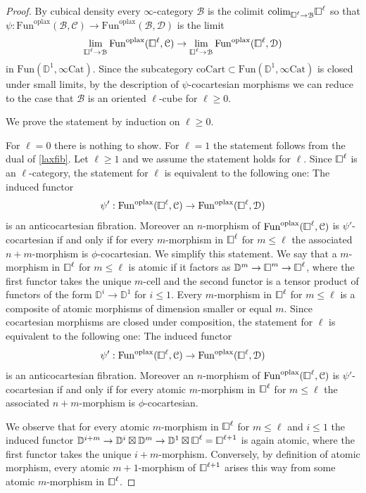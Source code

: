 \documentclass[10pt,oneside]{article}
\numberwithin{equation}{section} %
\numberwithin{figure}{section} %
\theoremstyle{plain}
\theoremstyle{definition}
\newcommand{\bD}{{\mathbb D}}
\newcommand{\mB}{{\mathcal B}}
\newcommand{\mC}{{\mathcal C}}
\newcommand{\mD}{{\mathcal D}}
\newcommand{\n}{{n}}
\newcommand{\colim}{\mathrm{colim}}
\newcommand{\Cat}{\mathrm{Cat}}
\newcommand{\Fun}{\mathrm{Fun}}
\newcommand{\coCart}{{\mathrm{coCart}}}
\newcommand{\oplax}{{\mathrm{oplax}}}
\newcommand{\cube}{{\,\vline\negmedspace\square}}
\begin{document}
\begin{proof}

By cubical density every $\infty$-category $\mB$ is the colimit
$\colim_{\cube^\ell \to \mB} \cube^\ell$ so that 
$\psi: \Fun^\oplax(\mB, \mC) \to \Fun^\oplax(\mB, \mD) $
is the limit 
$$ \lim_{\cube^\ell \to \mB} \Fun^\oplax(\cube^\ell, \mC) \to \lim_{\cube^\ell \to \mB} \Fun^\oplax(\cube^\ell, \mD) $$
in $\Fun(\bD^1,\infty\Cat)$. Since the subcategory $\coCart \subset \Fun(\bD^1,\infty\Cat) $ is closed under small limits,
by the description of $\psi$-cocartesian morphisms we can reduce to the case that $\mB$ is an oriented $\ell$-cube for $\ell \geq 0.$

We prove the statement by induction on $\ell \geq 0.$


For $\ell=0$ there is nothing to show.
For $\ell=1$ the statement follows from the dual of \cref{laxfib}.
Let $\ell \geq 1$ and we assume the statement holds for $\ell.$
Since $\cube^\ell $ is an $\ell$-category, the statement for $\ell $ is equivalent to the following one: The induced functor
$$\psi': \Fun^\oplax(\cube^{\ell}, \mC) \to \Fun^\oplax(\cube^{\ell}, \mD) $$
is an anticocartesian fibration.
Moreover an $\n$-morphism of $\Fun^\oplax(\cube^{\ell}, \mC)$ is $\psi'$-cocartesian if and only if for every $m$-morphism in $\cube^{\ell}$ for $m \leq \ell$ the associated $n +m$-morphism is $\phi$-cocartesian. 
We simplify this statement.
We say that a $m$-morphism in $\cube^{\ell}$ for $m \leq \ell$ 
is atomic if it factors as $\bD^m \to \cube^m \to \cube^\ell$,
where the first functor takes the unique $m$-cell and the second functor is a tensor product of functors of the form $\bD^i \to \bD^1$
for $i \leq 1.$
Every $m$-morphism in $\cube^{\ell}$ for $m \leq \ell$ is a composite of atomic morphisms of dimension smaller or equal $m$.
Since cocartesian morphisms are closed under composition, the statement for $\ell$ is equivalent to the following one:
The induced functor
$$\psi': \Fun^\oplax(\cube^{\ell}, \mC) \to \Fun^\oplax(\cube^{\ell}, \mD) $$
is an anticocartesian fibration.
Moreover an $\n$-morphism of $\Fun^\oplax(\cube^{\ell}, \mC)$ is $\psi'$-cocartesian if and only if for every atomic $m$-morphism in $\cube^{\ell}$ for $m \leq \ell$ the associated $n +m$-morphism is $\phi$-cocartesian. 

We observe that for every atomic $m$-morphism in $\cube^{\ell}$ for $m \leq \ell$ and $i \leq 1$ the induced functor
$\bD^{i+m} \to \bD^i \boxtimes \bD^m \to \bD^1 \boxtimes \cube^\ell = \cube^{\ell+1} $ is again atomic, where the first functor takes the unique $i+m$-morphism.
Conversely, by definition of atomic morphism, every atomic $m+1$-morphism of $\cube^{\ell+1}$ arises this way from some atomic $m$-morphism in $\cube^{\ell}$.


\end{proof}
\end{document}
